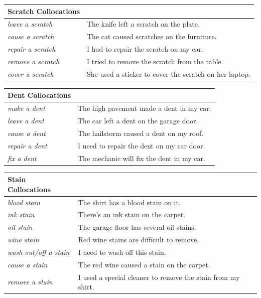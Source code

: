 \begin{table}[h]
\centering
\begin{tabular}{|l|p{10cm}|}
\hline
\textbf{Scratch Collocations} & \\
\hline
\textit{leave a scratch} & The knife left a scratch on the plate. \\
\textit{cause a scratch} & The cat caused scratches on the furniture. \\
\textit{repair a scratch} & I had to repair the scratch on my car. \\
\textit{remove a scratch} & I tried to remove the scratch from the table. \\
\textit{cover a scratch} & She used a sticker to cover the scratch on her laptop. \\
\hline
\end{tabular}
\end{table}

\begin{table}[h]
\centering
\begin{tabular}{|l|p{10cm}|}
\hline
\textbf{Dent Collocations} & \\
\hline
\textit{make a dent} & The high pavement made a dent in my car. \\
\textit{leave a dent} & The car left a dent on the garage door. \\
\textit{cause a dent} & The hailstorm caused a dent on my roof. \\
\textit{repair a dent} & I need to repair the dent on my car door. \\
\textit{fix a dent} & The mechanic will fix the dent in my car. \\
\hline
\end{tabular}
\end{table}

\begin{table}[h]
\centering
\begin{tabular}{|l|p{10cm}|}
\hline
\textbf{Stain Collocations} & \\
\hline
\textit{blood stain} & The shirt has a blood stain on it. \\
\textit{ink stain} & There's an ink stain on the carpet. \\
\textit{oil stain} & The garage floor has several oil stains. \\
\textit{wine stain} & Red wine stains are difficult to remove. \\
\textit{wash out/off a stain} & I need to wash off this stain. \\
\textit{cause a stain} & The red wine caused a stain on the carpet. \\
\textit{remove a stain} & I used a special cleaner to remove the stain from my shirt. \\
\hline
\end{tabular}
\end{table}

